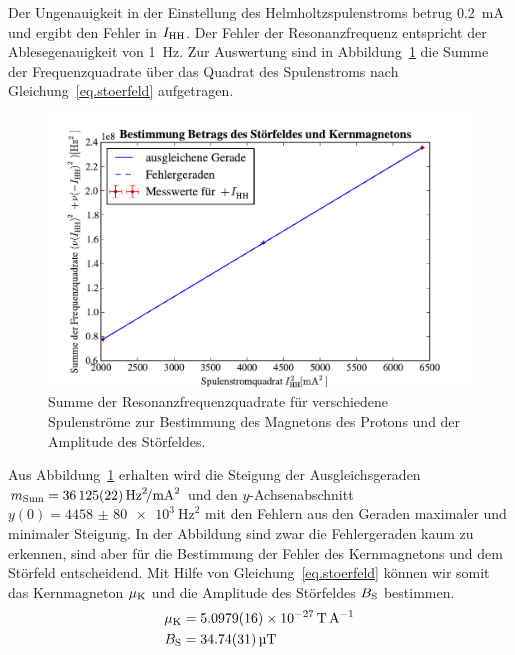 \documentclass[paper=a4,
	fontsize=10pt,
	DIV=18,
	twocolumn,
	parskip=half
	]{scrartcl}
\numberwithin{equation}{section}    %
\begin{document}
Der Ungenauigkeit in der Einstellung des Helmholtzspulenstroms betrug \SI{0.2}{\milli\ampere} und ergibt den Fehler in $I_{\rm HH}$. Der Fehler der Resonanzfrequenz entspricht der Ablesegenauigkeit von \SI{1}{\hertz}.
Zur Auswertung sind in Abbildung~\ref{fig.stoerfeld} die Summe der Frequenzquadrate über das Quadrat des Spulenstroms nach Gleichung~\eqref{eq.stoerfeld} aufgetragen.

\begin{figure}[htp]
	\begin{center}
		\includegraphics[width=\columnwidth]{Data-Plots/10-helmholtz-summe.pdf}
		\caption{Summe der Resonanzfrequenzquadrate für verschiedene Spulenströme zur Bestimmung des Magnetons des Protons und der Amplitude des Störfeldes.}
		\label{fig.stoerfeld}
	\end{center}
\end{figure}

Aus Abbildung~\ref{fig.stoerfeld} erhalten wird die Steigung der Ausgleichsgeraden $m_{\rm Sum} = \SI[per-mode=symbol]{36125(22)}{\hertz\squared\per\milli\ampere\squared} $ und den $y$-Achsenabschnitt $y(0) = \SI{4458(80)e3}{\hertz\squared}$ mit den Fehlern aus den Geraden maximaler und minimaler Steigung. In der Abbildung sind zwar die Fehlergeraden kaum zu erkennen, sind aber für die Bestimmung der Fehler des Kernmagnetons und dem Störfeld entscheidend.
Mit Hilfe von Gleichung~\eqref{eq.stoerfeld} können wir somit das Kernmagneton $\mu_{\rm K}$ und die Amplitude des Störfeldes $B_{\rm S}$ bestimmen.
\begin{align}
	\mu_{\rm K} &= \SI{5.0979(16)e-27}{\tesla\per\ampere}\\
	B_{\rm S} &=  \SI{34.74(31)}{\micro\tesla}
\end{align}
\end{document}
